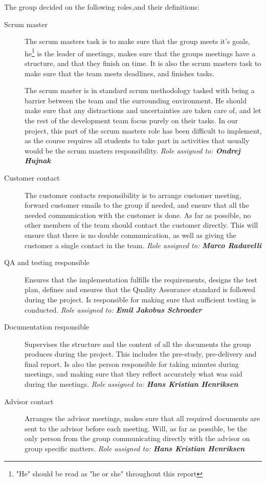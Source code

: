 \documentclass[11pt,a4paper,titlepage,oneside]{report}
\begin{document}
The group decided on the following roles,and their definitions:
\begin{description}
\item[Scrum master] The scrum masters task is to make sure that the group meets it's goals, he\footnote{"He" should be read as "he or she" throughout this report} is the leader of meetings, makes sure that the groups meetings have a structure, and that they finish on time. It is also the scrum masters task to make sure that the team meets deadlines, and finishes tasks. 

The scrum master is in standard scrum methodology tasked with being a barrier between the team and the surrounding environment. He should make sure that any distractions and uncertainties are taken care of, and let the rest of the development team focus purely on their tasks. In our project, this part of the scrum masters role has been difficult to implement, as the course requires all students to take part in activities that usually would be the scrum masters responsibility. 
\emph{Role assigned to: \textbf{Ondrej Hujnak}}

\item[Customer contact] The customer contacts responsibility is to arrange customer meeting, forward customer emails to the group if needed, and ensure that all the needed communication with the customer is done. As far as possible, no other members of the team should contact the customer directly. This will ensure that there is no double communication, as well as giving the customer a single contact in the team.
\emph{Role assigned to: \textbf{Marco Radavelli}}

\item[\gls{QA} and testing responsible] Ensures that the implementation fulfills the requirements, designs the test plan, defines and ensures that the Quality Assurance standard is followed during the project. Is responsible for making sure that sufficient testing is conducted.
\emph{Role assigned to: \textbf{Emil Jakobus Schroeder}}

\item[Documentation responsible] Supervises the structure and the content of all the documents the group produces during the project. This includes the pre-study, pre-delivery and final report. Is also the person responsible for taking minutes during meetings, and making sure that they reflect accurately what was said during the meetings.
\emph{Role assigned to: \textbf{Hans Kristian Henriksen}}

\item[Advisor contact] Arranges the advisor meetings, makes sure that all required documents are sent to the advisor before each meeting. Will, as far as possible, be the only person from the group communicating directly with the advisor on group specific matters.
\emph{Role assigned to: \textbf{Hans Kristian Henriksen}}


\end{description}
\end{document}
